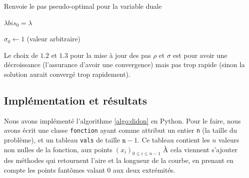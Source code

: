 \documentclass[10pt,a4paper]{article}
\newcommand{\R}{\mathbb{R}}
\theoremstyle{plain}
\theoremstyle{definition}
\begin{document}



\begin{algorithm}
	\caption{Renvoie le pas pseudo-optimal pour la variable duale}
	\label{algo:duale}
	
	\KwIn{$f \in \R^n$ et $\lambda \in \R$}
	$\lambda bis_0 = \lambda$

	$\sigma_0 \leftarrow 1$ (valeur arbitraire)

	
	\end{algorithm}

Le choix de $1.2$ et $1.3$ pour la mise à jour des pas $\rho$ et $\sigma$ est pour avoir une décroissance (l'assurance d'avoir une convergence) mais pas trop rapide (sinon la solution aurait convergé trop rapidement).




\subsection{Implémentation et résultats}

Nous avons implémenté l'algorithme \ref{algo:didon} en Python. Pour le faire, nous avons écrit une classe \texttt{fonction} ayant comme attribut un entier \texttt{n} (la taille du problème), et un tableau \texttt{vals} de taille $\texttt{n}-1$. Ce tableau contient les $n$ valeurs non nulles de la fonction, aux points $(x_i)_{0\leqslant i\leqslant n-1}$ À cela viennent s'ajouter des méthodes qui retournent l'aire et la longueur de la courbe, en prenant en compte les points \og fantômes \fg{} valant 0 aux deux extrémités.
\end{document}
